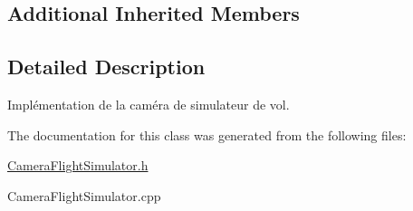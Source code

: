 \subsection*{Additional Inherited Members}


\subsection{Detailed Description}
Implémentation de la caméra de simulateur de vol. 

The documentation for this class was generated from the following files\-:\begin{DoxyCompactItemize}
\item 
\hyperlink{CameraFlightSimulator_8h}{Camera\-Flight\-Simulator.\-h}\item 
Camera\-Flight\-Simulator.\-cpp\end{DoxyCompactItemize}
